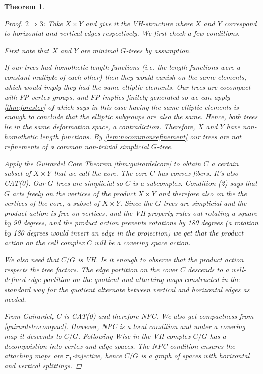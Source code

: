 \documentclass[12pt,parskip=full]{report}
\theoremstyle{plain}
\newtheorem{thm}{Theorem}[section]
\theoremstyle{definition}
\begin{document}
\begin{thm}
\begin{proof}
$2\Rightarrow 3$: Take $X \times Y$ and give it the VH-structure where $X$ and $Y$ correspond to horizontal and vertical edges respectively. We first check a few conditions.
    
    First note that $X$ and $Y$ are minimal $G$-trees by assumption.
    
    If our trees had homothetic length functions (i.e. the length functions were a constant multiple of each other) then they would vanish on the same elements, which would imply they had the same elliptic elements. Our trees are cocompact with FP vertex groups, and FP implies finitely generated so we can apply \ref{thm:forester} of \cite{foresterdeformationrigidity} which says in this case having the same elliptic elements is enough to conclude that the elliptic subgroups are also the same. Hence, both trees lie in the same deformation space, a contradiction. Therefore, \(X\) and \(Y\) have non-homothetic length functions. By \ref{lem:nocommonrefinement} our trees are not refinements of a common non-trivial simplicial $G$-tree.
    
    Apply the Guirardel Core Theorem \ref{thm:guirardelcore} to obtain $C$ a certain subset of $X \times Y$ that we call the core. The core \(C\) has convex fibers. It's also CAT(0). Our \(G\)-trees are simplicial so \(C\) is a subcomplex. Condition (2) says that $G$ acts freely on the vertices of the product $X\times Y$ and therefore also on the the vertices of the core, a subset of $X \times Y$. Since the \(G\)-trees are simplicial and the product action is free on vertices, and the VH property rules out rotating a square by 90 degrees, and the product action prevents rotations by 180 degrees (a rotation by 180 degrees would invert an edge in the projection) we get that the product action on the cell complex \(C\) will be a covering space action.
    
    We also need that $C/G$ is VH. Is it enough to observe that the product action respects the tree factors. The edge partition on the cover \(C\) descends to a well-defined edge partition on the quotient and attaching maps constructed in the standard way for the quotient alternate between vertical and horizontal edges as needed.
    
    From Guirardel, \(C\) is CAT(0) and therefore NPC. We also get compactness from \ref{guirardelcocompact}. However, NPC is a local condition and under a covering map it descends to \(C/G\). Following Wise in \cite{wisethesis} the VH-complex \(C/G\) has a decompoistion into vertex and edge spaces. The NPC condition ensures the attaching maps are \(\pi_1\)-injective, hence \(C/G\) is a graph of spaces with horizontal and vertical splittings.
    

\end{proof}
\end{thm}
\end{document}
